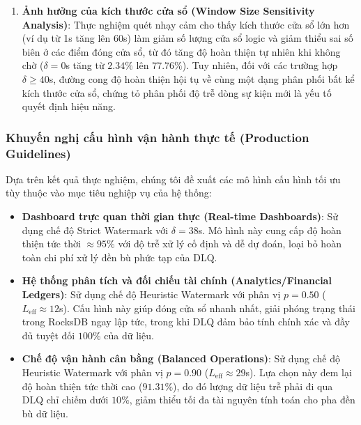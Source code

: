 \documentclass[12pt,a4paper]{article}
\begin{document}
\begin{enumerate}
    \item \textbf{Ảnh hưởng của kích thước cửa sổ (Window Size Sensitivity Analysis)}:
    Thực nghiệm quét nhạy cảm cho thấy kích thước cửa sổ lớn hơn (ví dụ từ 1s tăng lên 60s) làm giảm số lượng cửa sổ logic và giảm thiểu sai số biên ở các điểm đóng cửa sổ, từ đó tăng độ hoàn thiện tự nhiên khi không chờ ($\delta = 0$s tăng từ $2.34\%$ lên $77.76\%$). Tuy nhiên, đối với các trường hợp $\delta \ge 40$s, đường cong độ hoàn thiện hội tụ về cùng một dạng phân phối bất kể kích thước cửa sổ, chứng tỏ phân phối độ trễ dòng sự kiện mới là yếu tố quyết định hiệu năng.
\end{enumerate}

\subsubsection{Khuyến nghị cấu hình vận hành thực tế (Production Guidelines)}
Dựa trên kết quả thực nghiệm, chúng tôi đề xuất các mô hình cấu hình tối ưu tùy thuộc vào mục tiêu nghiệp vụ của hệ thống:
\begin{itemize}
    \item \textbf{Dashboard trực quan thời gian thực (Real-time Dashboards)}: Sử dụng chế độ Strict Watermark với $\delta = 38$s. Mô hình này cung cấp độ hoàn thiện tức thời $\approx 95\%$ với độ trễ xử lý cố định và dễ dự đoán, loại bỏ hoàn toàn chi phí xử lý đền bù phức tạp của DLQ.
    \item \textbf{Hệ thống phân tích và đối chiếu tài chính (Analytics/Financial Ledgers)}: Sử dụng chế độ Heuristic Watermark với phân vị $p = 0.50$ ($L_{\text{eff}} \approx 12$s). Cấu hình này giúp đóng cửa sổ nhanh nhất, giải phóng trạng thái trong RocksDB ngay lập tức, trong khi DLQ đảm bảo tính chính xác và đầy đủ tuyệt đối $100\%$ của dữ liệu.
    \item \textbf{Chế độ vận hành cân bằng (Balanced Operations)}: Sử dụng chế độ Heuristic Watermark với phân vị $p = 0.90$ ($L_{\text{eff}} \approx 29$s). Lựa chọn này đem lại độ hoàn thiện tức thời cao ($91.31\%$), do đó lượng dữ liệu trễ phải đi qua DLQ chỉ chiếm dưới $10\%$, giảm thiểu tối đa tài nguyên tính toán cho pha đền bù dữ liệu.
\end{itemize}
\end{document}
